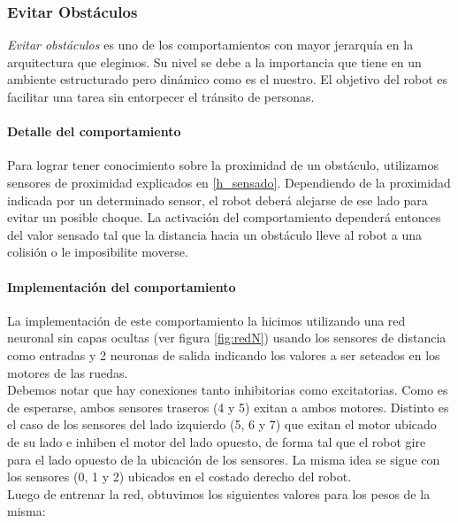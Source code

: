 \subsubsection{Evitar Obst\'aculos}
\label{avoid_obstacles}
\emph{Evitar obst\'aculos} es uno de los comportamientos con mayor jerarqu\'ia
en la arquitectura que elegimos. Su nivel se debe a la importancia que tiene
en un ambiente estructurado pero din\'amico como es el nuestro. El objetivo
del robot es facilitar una tarea sin entorpecer el tr\'ansito de personas.
\\\indent
\paragraph{Detalle del comportamiento}
Para lograr tener conocimiento sobre la proximidad de un obst\'aculo, utilizamos
sensores de proximidad explicados en \ref{h_sensado}. Dependiendo de la
proximidad indicada por un determinado sensor, el robot deber\'a alejarse
de ese lado para evitar un posible choque. La activaci\'on del comportamiento
depender\'a entonces del valor sensado tal que la distancia
hacia un obst\'aculo lleve al robot a una colisi\'on o le imposibilite
moverse.
\paragraph{Implementaci\'on del comportamiento}
La implementaci\'on de este comportamiento la hicimos utilizando una
red neuronal sin capas ocultas (ver figura \ref{fig:redN}) usando los sensores
de distancia como entradas y 2 neuronas de salida indicando los valores a
ser seteados en los motores de las ruedas.
\\\indent
Debemos notar que hay conexiones tanto inhibitorias como excitatorias. Como es
de esperarse, ambos sensores traseros (4 y 5) exitan a ambos motores. Distinto
es el caso de los sensores del lado izquierdo (5, 6 y 7) que exitan el motor
ubicado de su lado e inhiben el motor del lado opuesto, de forma tal que el
robot gire para el lado opuesto de la ubicaci\'on de los sensores. La misma
idea se sigue con los sensores (0, 1 y 2) ubicados en el costado derecho del
robot.
\\\indent
Luego de entrenar la red, obtuvimos los siguientes valores para los pesos de la
misma:


